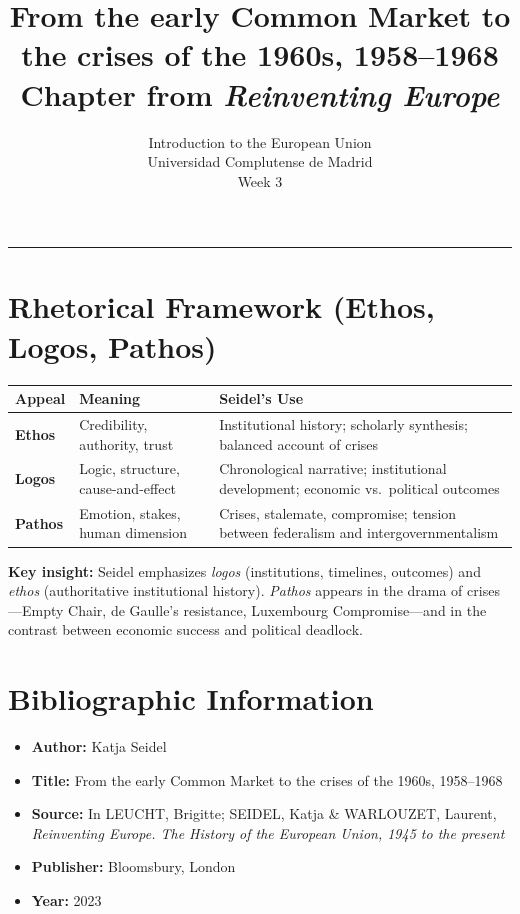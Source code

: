 \documentclass[11pt,a4paper]{article}
\begin{document}
\title{From the early Common Market to the crises of the 1960s, 1958--1968\\Chapter from \textit{Reinventing Europe}}
\author{Introduction to the European Union\\Universidad Complutense de Madrid\\Week 3}
\date{}
\maketitle
\vspace{-1em}
\hrule
\vspace{1em}

\section*{Rhetorical Framework (Ethos, Logos, Pathos)}

\begin{table}[h]
\centering
\begin{tabular}{@{}lll@{}}
\toprule
\textbf{Appeal} & \textbf{Meaning} & \textbf{Seidel's Use} \\
\midrule
\textbf{Ethos} & Credibility, authority, trust & Institutional history; scholarly synthesis; balanced account of crises \\
\textbf{Logos} & Logic, structure, cause-and-effect & Chronological narrative; institutional development; economic vs.\ political outcomes \\
\textbf{Pathos} & Emotion, stakes, human dimension & Crises, stalemate, compromise; tension between federalism and intergovernmentalism \\
\bottomrule
\end{tabular}
\end{table}

\textbf{Key insight:} Seidel emphasizes \textit{logos} (institutions, timelines, outcomes) and \textit{ethos} (authoritative institutional history). \textit{Pathos} appears in the drama of crises---Empty Chair, de Gaulle's resistance, Luxembourg Compromise---and in the contrast between economic success and political deadlock.

\section*{Bibliographic Information}

\begin{itemize}
\item \textbf{Author:} Katja Seidel
\item \textbf{Title:} From the early Common Market to the crises of the 1960s, 1958--1968
\item \textbf{Source:} In LEUCHT, Brigitte; SEIDEL, Katja \& WARLOUZET, Laurent, \textit{Reinventing Europe. The History of the European Union, 1945 to the present}
\item \textbf{Publisher:} Bloomsbury, London
\item \textbf{Year:} 2023
\end{itemize}
\end{document}
